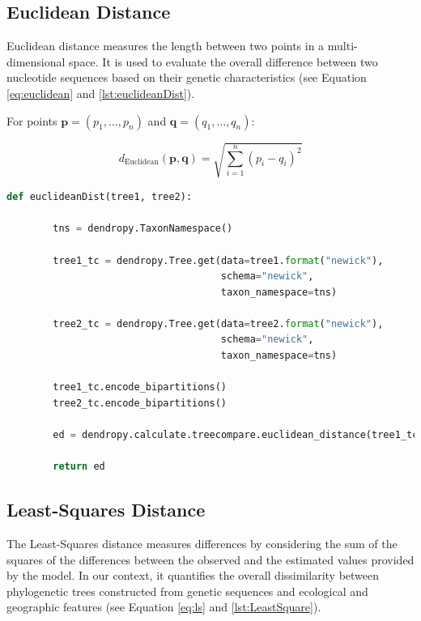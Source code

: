 \subsection{Euclidean Distance}\label{euclidean}
Euclidean distance measures the length between two points in a multi-dimensional space. It is used to evaluate the overall difference between two nucleotide sequences based on their genetic characteristics (see Equation \eqref{eq:euclidean} and \autoref{lst:euclideanDist}).

For points $\mathbf{p} = (p_1, \ldots, p_n)$ and $\mathbf{q} = (q_1, \ldots, q_n)$:

\begin{equation}\label{eq:euclidean}
    d_{\text{Euclidean}}(\mathbf{p}, \mathbf{q}) = \sqrt{\sum_{i=1}^{n} (p_i - q_i)^2}
\end{equation}

\begin{lstlisting}[label=lst:euclideanDist,language=Python,caption=Python script for calculating the Euclidean distance using the ete3 package in the aPhyloGeo package]
    def euclideanDist(tree1, tree2):
        
        tns = dendropy.TaxonNamespace()
        
        tree1_tc = dendropy.Tree.get(data=tree1.format("newick"), 
                                     schema="newick", 
                                     taxon_namespace=tns)
                                     
        tree2_tc = dendropy.Tree.get(data=tree2.format("newick"), 
                                     schema="newick", 
                                     taxon_namespace=tns)
                                     
        tree1_tc.encode_bipartitions()
        tree2_tc.encode_bipartitions()

        ed = dendropy.calculate.treecompare.euclidean_distance(tree1_tc, tree2_tc)

        return ed
\end{lstlisting}

\subsection{Least-Squares Distance}\label{LS}
The Least-Squares distance measures differences by considering the sum of the squares of the differences between the observed and the estimated values provided by the model. In our context, it quantifies the overall dissimilarity between phylogenetic trees constructed from genetic sequences and ecological and geographic features (see Equation \eqref{eq:ls} and \autoref{lst:LeastSquare}).

